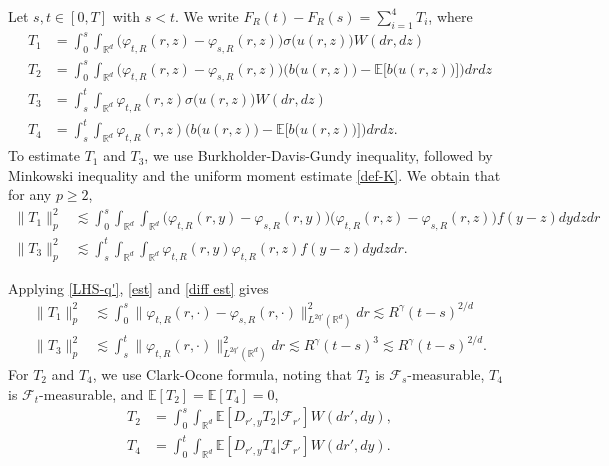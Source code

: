 \documentclass[12pt]{article}
\def\cF{\mathcal{F}}
\def\bE{\mathbb{E}}
\def\bR{\mathbb{R}}
\newcommand{\les}{\lesssim}
\begin{document}
Let $s,t \in [0,T]$ with $s<t$. We write $F_R(t)-F_R(s)=\sum_{i=1}^4 T_i$, where
\begin{align*}
T_1 & = \int_0^s \int_{\bR^d} \Big(\varphi_{t,R}(r,z) - \varphi_{s,R}(r,z) \Big) \sigma\big(u(r,z)\big) W(dr,dz)\\
T_2 &= \int_0^s \int_{\bR^d}  \Big( \varphi_{t,R}(r,z) - \varphi_{s,R}(r,z) \Big) \Big(b\big(u(r,z)\big) -\bE\big[b\big(u(r,z)\big) \big]\Big) drdz\\
T_3&=\int_s^t \int_{\bR^d} \varphi_{t,R}(r,z) \sigma\big(u(r,z)\big) W(dr,dz)\\
T_4&=\int_s^t \int_{\bR^d}  \varphi_{t,R}(r,z)  \Big(b\big(u(r,z)\big) -\bE\big[b\big(u(r,z)\big) \big]\Big) drdz.
\end{align*}
To estimate $T_1$ and $T_3$, we use Burkholder-Davis-Gundy inequality, followed by Minkowski inequality and the uniform moment estimate \eqref{def-K}. We obtain that for any $p\geq 2$,
\begin{align*}
\|T_1\|_p^2 & \les \int_0^s \int_{\bR^d} \int_{\bR^d}\Big(\varphi_{t,R}(r,y) - \varphi_{s,R}(r,y) \Big)  \Big(\varphi_{t,R}(r,z) - \varphi_{s,R}(r,z) \Big) f(y-z)dydz dr \\
\|T_3\|_p^2 & \les \int_s^t \int_{\bR^d} \int_{\bR^d} \varphi_{t,R}(r,y) \varphi_{t,R}(r,z) f(y-z) dydzdr.
\end{align*}
 
Applying \eqref{LHS-q'}, \eqref{est} and \eqref{diff est} gives
\begin{align*}
\|T_1\|_p^2 & \les \int_0^s \| \varphi_{t,R}(r,\cdot) - \varphi_{s,R}(r,\cdot)  \|_{L^{2q'}(\bR^d)}^2 dr \les R^{\gamma}(t-s)^{2/d}\\
\|T_3\|_p^2 & \les \int_s^t \| \varphi_{t,R}(r,\cdot) \|_{L^{2q'}(\bR^d)}^2 dr \les R^{\gamma}(t-s)^3 \les  R^{\gamma}(t-s)^{2/d}.
\end{align*}
For $T_2$ and $T_4$, we use Clark-Ocone formula, noting that $T_2$ is $\cF_s$-measurable, $T_4$ is $\cF_t$-measurable, and $\bE[T_2] = \bE[T_4] = 0$,
\begin{align*}
T_2 & = \int_0^s \int_{\bR^d} \bE[D_{r',y} T_2 |\cF_{r'}] W(dr',dy), \\
T_4 & = \int_0^t \int_{\bR^d}\bE[D_{r',y} T_4  | \cF_{r'}] W(dr',dy). 
\end{align*}
\end{document}
